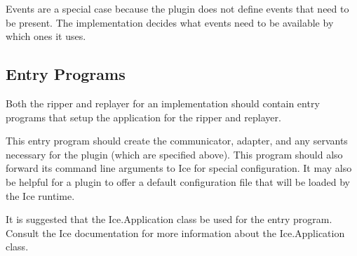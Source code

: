 Events are a special case because the plugin does not define events that need to be present. The implementation decides what events need to be available by which ones it uses.

\subsection{Entry Programs}

Both the ripper and replayer for an implementation should contain entry programs that setup the application for the ripper and replayer.

This entry program should create the communicator, adapter, and any servants necessary for the plugin (which are specified above). This program should also forward its command line arguments to Ice for special configuration. It may also be helpful for a plugin to offer a default configuration file that will be loaded by the Ice runtime.

It is suggested that the Ice.Application class be used for the entry program. Consult the Ice documentation for more information about the Ice.Application class.
